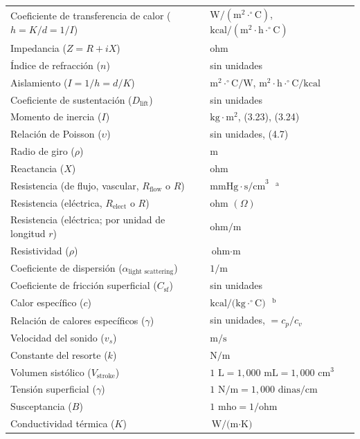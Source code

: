 \documentclass[12pt,a4paper]{book}
\begin{document}
\begin{table}[htbp]
\begin{tabularx}{\textwidth}{>{\hsize=1.0\hsize}X >{\hsize=1.0\hsize}X}
    Coeficiente de transferencia de calor ($h = K/d = 1/I$) & $\text{W/}(\text{m}^2\cdot^\circ\text{C})$, $\text{kcal/}(\text{m}^2\cdot\text{h}\cdot^\circ\text{C})$ \\
    Impedancia ($Z = R + iX$) & ohm \\
    Índice de refracción ($n$) & sin unidades \\
    Aislamiento ($I = 1/h = d/K$) & $\text{m}^2\cdot^\circ\text{C/W}$, $\text{m}^2\cdot\text{h}\cdot^\circ\text{C/kcal}$ \\
    Coeficiente de sustentación ($D_{\text{lift}}$) & sin unidades \\
    Momento de inercia ($I$) & $\text{kg}\cdot\text{m}^2$, (3.23), (3.24) \\
    Relación de Poisson ($\upsilon$) & sin unidades, (4.7) \\
    Radio de giro ($\rho$) & $\text{m}$ \\
    Reactancia ($X$) & ohm \\
    Resistencia (de flujo, vascular, $R_{\text{flow}}$ o $R$) & $\text{mmHg}\cdot\text{s/cm}^3\text{ }^{\text{a}}$ \\
    Resistencia (eléctrica, $R_{\text{elect}}$ o $R$) & $\text{ohm } (\Omega)$ \\
    Resistencia (eléctrica; por unidad de longitud $r$) & $\text{ohm/m}$ \\
    Resistividad ($\rho$) & $\text{ohm}\cdot\text{m}$ \\
    Coeficiente de dispersión ($\alpha_{\text{light scattering}}$) & $1/\text{m}$ \\
    Coeficiente de fricción superficial ($C_{\text{sf}}$) & sin unidades \\
    Calor específico ($c$) & $\text{kcal/(kg}\cdot^\circ\text{C)}\text{ }^{\text{b}}$ \\
    Relación de calores específicos ($\gamma$) & sin unidades, $= c_p/c_v$ \\
    Velocidad del sonido ($v_s$) & $\text{m/s}$ \\
    Constante del resorte ($k$) & $\text{N/m}$ \\
    Volumen sistólico ($V_{\text{stroke}}$) & $1\text{ L} = 1,000\text{ mL} = 1,000\text{ cm}^3$ \\
    Tensión superficial ($\gamma$) & $1\text{ N/m} = 1,000\text{ dinas/cm}$ \\
    Susceptancia ($B$) & $1\text{ mho} = 1/\text{ohm}$ \\
    Conductividad térmica ($K$) & $\text{W/(m}\cdot\text{K)}$ \\

\end{tabularx}
\end{table}
\end{document}
